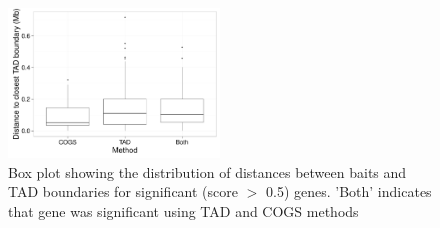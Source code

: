 \documentclass[a4paper,11pt]{report}
\begin{document}
\begin{figure}[ht]
\centering
\includegraphics[width=0.5\textwidth]{dist_boxplot.pdf}
\caption{Box plot showing the distribution of distances between baits and TAD boundaries for significant (score $>$ 0.5) genes. ’Both’ indicates that gene was significant using TAD and COGS methods}
\label{fig:distance_distro}
\end{figure}
\end{document}
